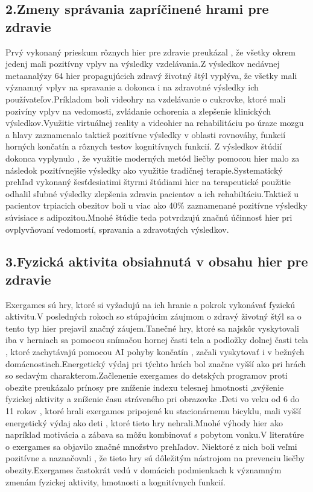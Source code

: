 \documentclass[10pt,oneside,slovak,a4paper]{article}
\begin{document}
\subsection{2.Zmeny správania zapríčinené hrami pre zdravie}
Prvý vykonaný prieskum rôznych hier pre zdravie preukázal , že všetky okrem jedenj mali pozitívny vplyv na výsledky vzdelávania.Z výsledkov nedávnej metaanalýzy 64 hier propagujúcich zdravý životný štýl vyplýva, že všetky mali významný vplyv na spravanie a dokonca i na zdravotné výsledky ich používateľov.Príkladom boli videohry na vzdelávanie o cukrovke, ktoré mali pozivíny vplyv na vedomosti, zvládanie ochorenia a zlepšenie klinických výsledkov.Využitie virtuálnej reality a videohier na rehabilitáciu po úraze mozgu a hlavy zaznamenalo taktiež pozitívne výsledky v oblasti rovnováhy, funkcií horných končatín a rôznych testov kognitívnych funkcií. Z výsledkov štúdií dokonca vyplynulo , že využitie moderných metód liečby pomocou hier malo za následok  pozitívnejšie výsledky ako využitie tradičnej terapie.Systematický prehľad vykonaný šesťdesiatimi štyrmi štúdiami hier na terapeutické použitie odhalil sľubné výsledky zlepšenia zdravia pacientov a ich rehabiltáciu.Taktiež u pacientov trpiacich obezitov boli u viac ako 40\% zaznamenané pozitívne výsledky súvisiace s adipozitou.Mnohé štúdie teda potvrdzujú značnú účinnosť hier pri ovplyvňovaní vedomostí, spravania a zdravotných výsledkov.

\subsection{3.Fyzická aktivita obsiahnutá v obsahu hier pre zdravie}
Exergames sú hry, ktoré si vyžadujú na ich hranie a pokrok vykonávať fyzickú aktivitu.V posledných rokoch so stúpajúcim záujmom o zdravý životný štýl sa o tento typ hier prejavil značný záujem.Tanečné hry, ktoré sa najskôr vyskytovali iba v herniach sa pomocou snímačou hornej časti tela a podložky dolnej časti tela , ktoré zachytávajú pomocou AI pohyby končatín , začali vyskytovať i v bežných domácnostiach.Energetický výdaj pri týchto hrách bol značne vyšší ako pri hrách so sedavým charakterom.Začlenenie exergames do detských programov proti obezite preukázalo prínosy pre zníženie indexu telesnej hmotnosti ,zvýšenie fyzickej aktivity a zníženie času stráveného pri obrazovke \cite{5962085}.Deti vo veku od 6 do 11 rokov , ktoré hrali exergames pripojené ku stacionárnemu bicyklu, mali vyšší energetický výdaj ako deti , ktoré tieto hry nehrali.Mnohé výhody hier ako napríklad motivácia a zábava sa môžu kombinovať s pobytom vonku.V literatúre o exergames sa objavilo značné množstvo prehľadov. Niektoré z nich boli veľmi pozitívne a naznačovali , že tieto hry sú dôležitým nástrojom na prevenciu liečby obezity.Exergames častokrát vedú v domácich podmienkach k významným zmenám fyzickej aktivity, hmotnosti a kognitívnych funkcií.
\end{document}
